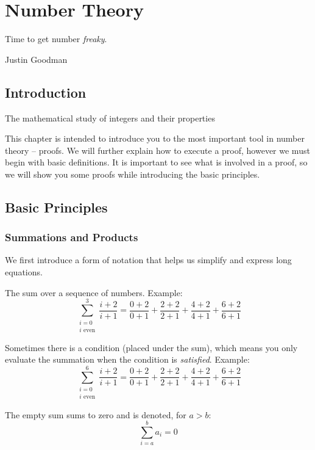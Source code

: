 \documentclass[main.tex]{subfiles}
\begin{document}
\chapter{Number Theory}

\epigraph{Time to get number \textit{freaky}.}{Justin Goodman}

\minitoc

\section{Introduction}

\begin{defn}
	The mathematical study of integers and their properties
\end{defn}

This chapter is intended to introduce you to the most important tool in number theory -- proofs. We will further explain how to execute a proof, however we must begin with basic definitions. It is important to see what is involved in a proof, so we will show you some proofs while introducing the basic principles.

\section{Basic Principles}

\subsection{Summations and Products}

We first introduce a form of notation that helps us simplify and express long equations.

\begin{defn}
	The sum over a sequence of numbers. Example: \[\sum_{\substack{i = 0 \\ i \text{ even}}}^{3} \frac{i+2}{i+1} = \frac{0+2}{0+1}+\frac{2+2}{2+1}+\frac{4+2}{4+1}+\frac{6+2}{6+1}\]
	
	Sometimes there is a condition (placed under the sum), which means you only evaluate the summation when the condition is \textit{satisfied}. Example: \[\sum_{\substack{i = 0 \\ i \text{ even}}}^{6} \frac{i+2}{i+1} = \frac{0+2}{0+1}+\frac{2+2}{2+1}+\frac{4+2}{4+1}+\frac{6+2}{6+1}\]
\end{defn}

The empty sum sums to zero and is denoted, for \(a > b\): \[\sum_{i = a}^{b} a_i = 0\]
\end{document}
